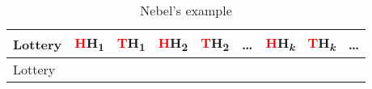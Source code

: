 \documentclass[
  letterpaper,
  DIV=11,
  numbers=noendperiod,
  oneside]{scrartcl}
\begin{document}
\begin{longtable}[]{@{}
  >{\raggedleft\arraybackslash}p{}
  >{\centering\arraybackslash}p{}
  >{\centering\arraybackslash}p{}
  >{\centering\arraybackslash}p{}
  >{\centering\arraybackslash}p{}
  >{\centering\arraybackslash}p{}
  >{\centering\arraybackslash}p{}
  >{\centering\arraybackslash}p{}
  >{\centering\arraybackslash}p{}@{}}
\caption{Nebel's example}\label{tbl-nebel}\tabularnewline
\toprule\noalign{}
\begin{minipage}[b]{\linewidth}\raggedleft
Lottery
\end{minipage} & \begin{minipage}[b]{\linewidth}\centering
\textcolor{red}{H}H\textsubscript{1}
\end{minipage} & \begin{minipage}[b]{\linewidth}\centering
\textcolor{red}{T}H\textsubscript{1}
\end{minipage} & \begin{minipage}[b]{\linewidth}\centering
\textcolor{red}{H}H\textsubscript{2}
\end{minipage} & \begin{minipage}[b]{\linewidth}\centering
\textcolor{red}{T}H\textsubscript{2}
\end{minipage} & \begin{minipage}[b]{\linewidth}\centering
\ldots{}
\end{minipage} & \begin{minipage}[b]{\linewidth}\centering
\textcolor{red}{H}H\textsubscript{\emph{k}}
\end{minipage} & \begin{minipage}[b]{\linewidth}\centering
\textcolor{red}{T}H\textsubscript{\emph{k}}
\end{minipage} & \begin{minipage}[b]{\linewidth}\centering
\ldots{}
\end{minipage} \\
\midrule\noalign{}
\endfirsthead
\toprule\noalign{}
\begin{minipage}[b]{\linewidth}\raggedleft
Lottery
\end{minipage} & \begin{minipage}[b]{\linewidth}\centering

\end{minipage}
\end{longtable}
\end{document}
